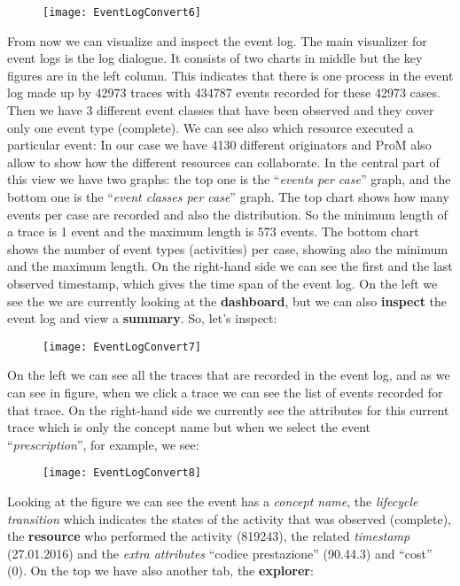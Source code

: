 \documentclass[paper=a4, fontsize=11pt]{scrartcl} %
\numberwithin{equation}{section} %
\numberwithin{figure}{section} %
\numberwithin{table}{section} %
\begin{document}
\begin{figure} [htbp]
\centering
\texttt{[image: EventLogConvert6]}
\end{figure}
From now we can visualize and inspect the event log. The main visualizer for event logs is the log dialogue. It consists of two charts in middle but the key figures are in the left column. This indicates that there is one process in the event log made up by 42973 traces with 434787 events recorded for these 42973 cases. Then we have 3 different event classes that have been observed and they cover only one event type (complete). We can see also which resource executed a particular event: In our case we have 4130 different originators and ProM also allow to show how the different resources can collaborate. In the central part of this view we have two graphs: the top one is the ``\textit{events per case}'' graph, and the bottom one is the ``\textit{event classes per case}'' graph. The top chart shows how many events per case are recorded and also the distribution. So the minimum length of a trace is 1 event and the maximum length is 573 events. The bottom chart shows the number of event types (activities) per case, showing also the minimum and the maximum length. On the right-hand side we can see the first and the last observed timestamp, which gives the time span of the event log. On the left we see the we are currently looking at the \textbf{dashboard}, but we can also \textbf{inspect} the event log and view a \textbf{summary}. So, let's inspect:
\newpage
\begin{figure} [htbp]
\centering
\texttt{[image: EventLogConvert7]}
\end{figure}
On the left we can see all the traces that are recorded in the event log, and as we can see in figure, when we click a trace we can see the list of events recorded for that trace. On the right-hand side we currently see the attributes for this current trace which is only the concept name but when we select the event ``\textit{prescription}'', for example, we see: 
\begin{figure} [htbp]
\centering
\texttt{[image: EventLogConvert8]}
\end{figure}
\newpage
Looking at the figure we can see the event has a \textit{concept name}, the \textit{lifecycle transition} which indicates the states of the activity that was observed (complete), the \textbf{resource} who performed the activity (819243), the related \textit{timestamp} (27.01.2016) and the \textit{extra attributes} ``codice prestazione'' (90.44.3) and ``cost'' (0). On the top we have also another tab, the \textbf{explorer}:
\end{document}
